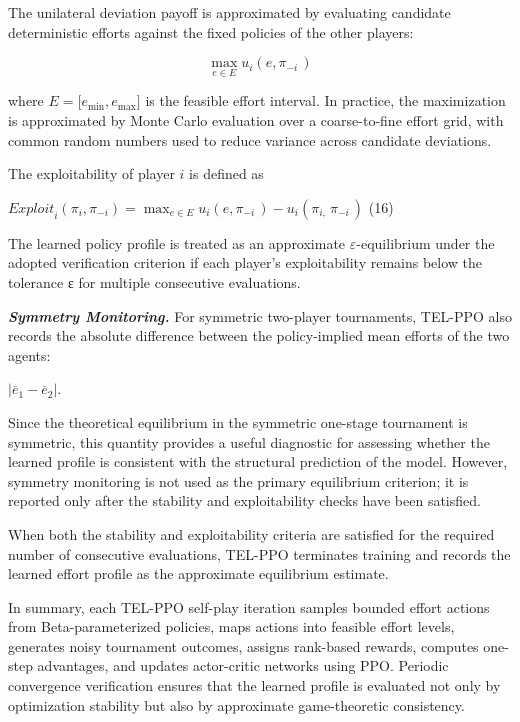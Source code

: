 \documentclass[
]{article}
\begin{document}
The unilateral deviation payoff is approximated by evaluating candidate
deterministic efforts against the fixed policies of the other players:

\[\max_{e \in E}u_{i}(e,\pi_{- i\ })\]

where \(E = \lbrack e_{\min},e_{\max}\rbrack\) is the feasible effort
interval. In practice, the maximization is approximated by Monte Carlo
evaluation over a coarse-to-fine effort grid, with common random numbers
used to reduce variance across candidate deviations.

The exploitability of player \(i\) is defined as

\({Exploit}_{i}\left( \pi_{i},\pi_{- i} \right) = \max_{e \in E}u_{i}(e,\pi_{- i\ }) - u_{i}(\pi_{i,\ }\pi_{- i\ })\)
(16)

The learned policy profile is treated as an approximate
\(\varepsilon\)-equilibrium under the adopted verification criterion if
each player's exploitability remains below the tolerance ε for multiple
consecutive evaluations.

\emph{\textbf{Symmetry Monitoring.}} For symmetric two-player
tournaments, TEL-PPO also records the absolute difference between the
policy-implied mean efforts of the two agents:

\(|{\overline{e}}_{1} - {\overline{e}}_{2}|\).

Since the theoretical equilibrium in the symmetric one-stage tournament
is symmetric, this quantity provides a useful diagnostic for assessing
whether the learned profile is consistent with the structural prediction
of the model. However, symmetry monitoring is not used as the primary
equilibrium criterion; it is reported only after the stability and
exploitability checks have been satisfied.

When both the stability and exploitability criteria are satisfied for
the required number of consecutive evaluations, TEL-PPO terminates
training and records the learned effort profile as the approximate
equilibrium estimate.

In summary, each TEL-PPO self-play iteration samples bounded effort
actions from Beta-parameterized policies, maps actions into feasible
effort levels, generates noisy tournament outcomes, assigns rank-based
rewards, computes one-step advantages, and updates actor-critic networks
using PPO. Periodic convergence verification ensures that the learned
profile is evaluated not only by optimization stability but also by
approximate game-theoretic consistency.
\end{document}
